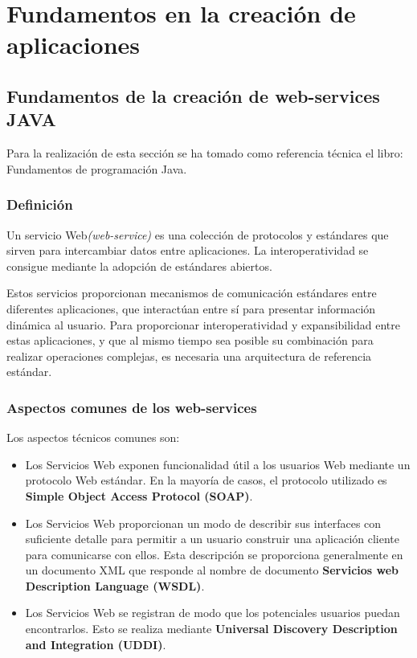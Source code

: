 \chapter{Fundamentos en la creación de aplicaciones}

\section{Fundamentos de la creación de web-services JAVA}

Para la realización de esta sección se ha tomado como referencia técnica el libro: Fundamentos de programación Java. \cite{javaFun} 

\subsection{Definición}

\begin{shaded}
	\begin{flushleft}	
		Un servicio Web\textit{(web-service)} es una colección de protocolos y estándares que sirven para intercambiar datos entre aplicaciones. La interoperatividad se consigue mediante la adopción de estándares abiertos. 
	\end{flushleft}			
\end{shaded}

Estos servicios proporcionan mecanismos de comunicación estándares entre diferentes aplicaciones, que interactúan entre sí para presentar información dinámica al usuario. Para proporcionar interoperatividad y expansibilidad entre estas aplicaciones, y que al mismo tiempo sea posible su combinación para realizar operaciones complejas, es necesaria una arquitectura de referencia estándar. 
\pagebreak

\subsection{Aspectos comunes de los web-services}

Los aspectos técnicos comunes son: 
\begin{itemize}
	\item Los Servicios Web exponen funcionalidad útil a los usuarios Web mediante un protocolo Web estándar. En la mayoría de casos, el protocolo utilizado es \textbf{Simple Object Access Protocol (SOAP)}. 
	
	\item Los Servicios Web proporcionan un modo de describir sus interfaces con suficiente detalle para permitir a un usuario construir una aplicación cliente para comunicarse con ellos. Esta descripción se proporciona generalmente en un documento XML que responde al nombre de documento\textbf{ Servicios web Description Language (WSDL)}. 
	
	\item Los Servicios Web se registran de modo que los potenciales usuarios puedan encontrarlos. Esto se realiza mediante\textbf{ Universal Discovery Description and Integration (UDDI)}. 
\end{itemize}
	
